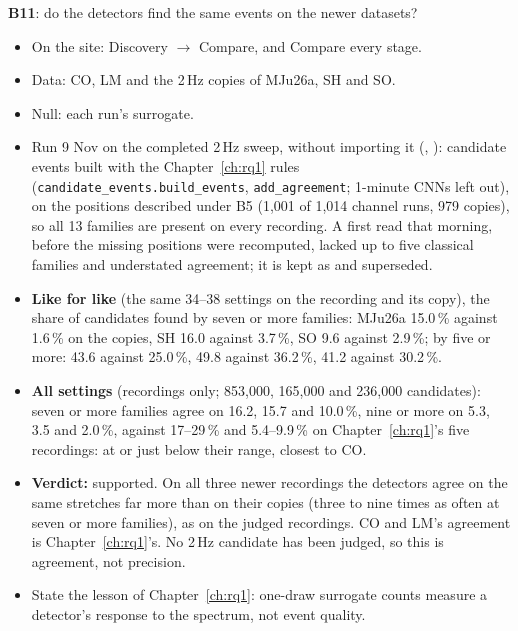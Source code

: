 \begin{instructions}
\textbf{B11}: do the detectors find the same events on the newer datasets?
\begin{itemize}
  \item On the site: Discovery $\rightarrow$ Compare, and Compare every stage.
  \item Data: CO, LM and the 2\,Hz copies of MJu26a, SH and SO.
  \item Null: each run's surrogate.
  \item Run 9 Nov on the completed 2\,Hz sweep, without importing it (,
        ): candidate events built with the Chapter~\ref{ch:rq1}
        rules (\texttt{candidate\_events.build\_events}, \texttt{add\_agreement}; 1-minute CNNs left out), on the
        positions described under B5 (1,001 of 1,014 channel runs, 979 copies), so all 13 families are present on every
        recording. A first read that morning, before the missing positions were recomputed, lacked up to five
        classical families and understated agreement; it is kept as  and superseded.
  \item \textbf{Like for like} (the same 34--38 settings on the recording and its copy), the share of candidates found
        by seven or more families: MJu26a 15.0\,\% against 1.6\,\% on the copies, SH 16.0 against 3.7\,\%, SO 9.6
        against 2.9\,\%; by five or more: 43.6 against 25.0\,\%, 49.8 against 36.2\,\%, 41.2 against 30.2\,\%.
  \item \textbf{All settings} (recordings only; 853,000, 165,000 and 236,000 candidates): seven or more families
        agree on 16.2, 15.7 and 10.0\,\%, nine or more on 5.3, 3.5 and 2.0\,\%, against 17--29\,\% and 5.4--9.9\,\% on
        Chapter~\ref{ch:rq1}'s five recordings: at or just below their range, closest to CO.
  \item \textbf{Verdict:} supported. On all three newer recordings the detectors agree on the same stretches far
        more than on their copies (three to nine times as often at seven or more families), as on the judged
        recordings. CO and LM's agreement is Chapter~\ref{ch:rq1}'s. No 2\,Hz candidate has been judged, so this is
        agreement, not precision.
  \item State the lesson of Chapter~\ref{ch:rq1}: one-draw surrogate counts measure a detector's response to the
        spectrum, not event quality.
\end{itemize}
\end{instructions}

